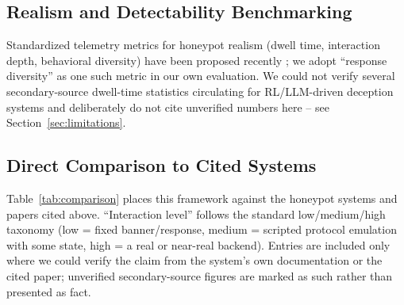 \documentclass[conference]{IEEEtran}
\begin{document}
\subsection{Realism and Detectability Benchmarking}

Standardized telemetry metrics for honeypot realism (dwell time, interaction
depth, behavioral diversity) have been proposed recently
\cite{ijnsa2026telemetry}; we adopt ``response diversity'' as one such metric
in our own evaluation. We could not verify several secondary-source
dwell-time statistics circulating for RL/LLM-driven deception systems and
deliberately do not cite unverified numbers here -- see Section~\ref{sec:limitations}.

\subsection{Direct Comparison to Cited Systems}

Table~\ref{tab:comparison} places this framework against the honeypot
systems and papers cited above. ``Interaction level'' follows the standard
low/medium/high taxonomy (low = fixed banner/response, medium = scripted
protocol emulation with some state, high = a real or near-real backend).
Entries are included only where we could verify the claim from the system's
own documentation or the cited paper; unverified secondary-source figures
are marked as such rather than presented as fact.
\end{document}
